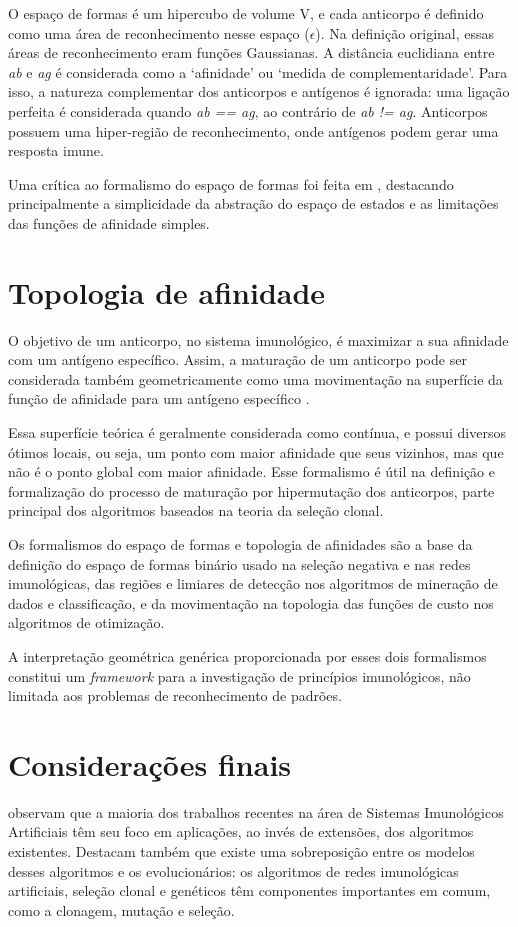 O espaço de formas é um hipercubo de volume V, e cada anticorpo é definido como uma área de reconhecimento nesse espaço ($\epsilon$). Na definição original, essas áreas de reconhecimento eram funções Gaussianas. A distância euclidiana entre \emph{ab} e \emph{ag} é considerada como a `afinidade' ou `medida de complementaridade'. Para isso, a natureza complementar dos anticorpos e antígenos é ignorada: uma ligação perfeita é considerada quando \emph{ab == ag}, ao contrário de \emph{ab != ag}. Anticorpos possuem uma hiper-região de reconhecimento, onde antígenos podem gerar uma resposta imune.

Uma crítica ao formalismo do espaço de formas foi feita em \citet{Carneiro1994}, destacando principalmente a simplicidade da abstração do espaço de estados e as limitações das funções de afinidade simples.

\section{Topologia de afinidade}

O objetivo de um anticorpo, no sistema imunológico, é maximizar a sua afinidade com um antígeno específico. Assim, a maturação de um anticorpo pode ser considerada também geometricamente como uma movimentação na superfície da função de afinidade para um antígeno específico \cite{Brownlee2007}.

Essa superfície teórica é geralmente considerada como contínua, e possui diversos ótimos locais, ou seja, um ponto com maior afinidade que seus vizinhos, mas que não é o ponto global com maior afinidade. Esse formalismo é útil na definição e formalização do processo de maturação por hipermutação dos anticorpos, parte principal dos algoritmos baseados na teoria da seleção clonal.

Os formalismos do espaço de formas e topologia de afinidades são a base da definição do espaço de formas binário usado na seleção negativa e nas redes imunológicas, das regiões e limiares de detecção nos algoritmos de mineração de dados e classificação, e da movimentação na topologia das funções de custo nos algoritmos de otimização.

A interpretação geométrica genérica proporcionada por esses dois formalismos constitui um \emph{framework} para a investigação de princípios imunológicos, não limitada aos problemas de reconhecimento de padrões.

\section{Considerações finais}

\citet{Dasgupta2010} observam que a maioria dos trabalhos recentes na área de Sistemas Imunológicos Artificiais têm seu foco em aplicações, ao invés de extensões, dos algoritmos existentes. Destacam também que existe uma sobreposição entre os modelos desses algoritmos e os evolucionários: os algoritmos de redes imunológicas artificiais, seleção clonal e genéticos têm componentes importantes em comum, como a clonagem, mutação e seleção.
